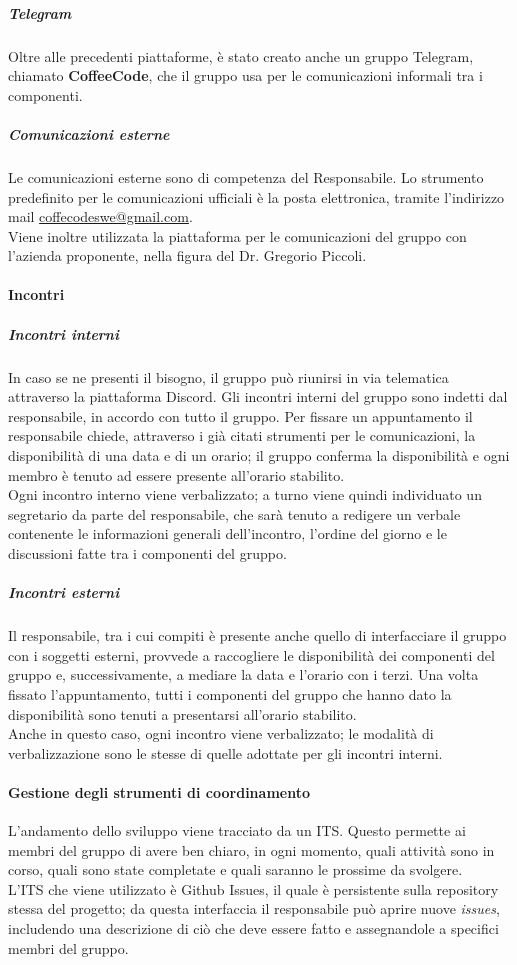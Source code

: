 \documentclass[../norme-di-progetto.tex]{subfiles}
\begin{document}
\subparagraph*{Telegram}
Oltre alle precedenti piattaforme, è stato creato anche un gruppo Telegram, chiamato \textbf{CoffeeCode}, che il gruppo usa per le comunicazioni informali tra i componenti.

\subparagraph{Comunicazioni esterne}
Le comunicazioni esterne sono di competenza del Responsabile. Lo strumento predefinito per le comunicazioni ufficiali è la posta elettronica, tramite l'indirizzo mail \href{coffecodeswe@gmail.com}{coffecodeswe@gmail.com}. \\
Viene inoltre utilizzata la piattaforma  per le comunicazioni del gruppo con l'azienda proponente, nella figura del Dr. Gregorio Piccoli.

\paragraph{Incontri}
\subparagraph{Incontri interni}
In caso se ne presenti il bisogno, il gruppo può riunirsi in via telematica attraverso la piattaforma Discord. Gli incontri interni del gruppo sono indetti dal responsabile, in accordo con tutto il gruppo. Per fissare un appuntamento il responsabile chiede, attraverso i già citati strumenti per le comunicazioni, la disponibilità di una data e di un orario; il gruppo conferma la disponibilità e ogni membro è tenuto ad essere presente all'orario stabilito. \\
Ogni incontro interno viene verbalizzato; a turno viene quindi individuato un segretario da parte del responsabile, che sarà tenuto a redigere un verbale contenente le informazioni generali dell'incontro, l'ordine del giorno e le discussioni fatte tra i componenti del gruppo.

\subparagraph{Incontri esterni}
Il responsabile, tra i cui compiti è presente anche quello di interfacciare il gruppo con i soggetti esterni, provvede a raccogliere le disponibilità dei componenti del gruppo e, successivamente, a mediare la data e l'orario con i terzi. Una volta fissato l'appuntamento, tutti i componenti del gruppo che hanno dato la disponibilità sono tenuti a presentarsi all'orario stabilito. \\
Anche in questo caso, ogni incontro viene verbalizzato; le modalità di verbalizzazione sono le stesse di quelle adottate per gli incontri interni.

\paragraph{Gestione degli strumenti di coordinamento}
L'andamento dello sviluppo viene tracciato da un ITS. Questo permette ai membri del gruppo di avere ben chiaro, in ogni momento, quali attività sono in corso, quali sono state completate e quali saranno le prossime da svolgere. \\
L'ITS che viene utilizzato è Github Issues, il quale è persistente sulla repository stessa del progetto; da questa interfaccia il responsabile può aprire nuove \textit{issues}, includendo una descrizione di ciò che deve essere fatto e assegnandole a specifici membri del gruppo.
\end{document}
